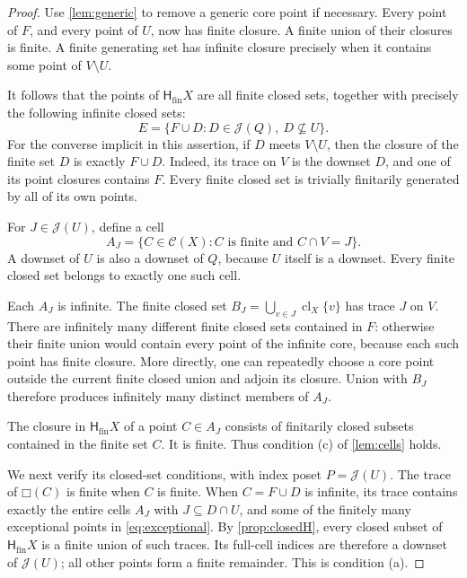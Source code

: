 \documentclass[11pt,a4paper]{article}
\theoremstyle{definition}
\newcommand{\Cl}{\mathcal C}
\newcommand{\Hfin}{\mathsf H_{\mathrm{fin}}}
\newcommand{\JJ}{\mathcal J}
\newcommand{\cl}{\operatorname{cl}}
\newcommand{\boxF}[1]{\mathord{\Box}(#1)}
\numberwithin{equation}{section}
\begin{document}
\begin{proof}
Use \cref{lem:generic} to remove a generic core point if necessary.
Every point of $F$, and every point of $U$, now has finite closure.
A finite union of their closures is finite.  A finite generating set
has infinite closure precisely when it contains some point of $V\setminus U$.

It follows that the points of $\Hfin X$ are all finite closed sets,
together with precisely the following infinite closed sets:
\begin{equation}\label{eq:exceptional}
 E=\{F\cup D:D\in\JJ(Q),\ D\nsubseteq U\}.
\end{equation}
For the converse implicit in this assertion, if $D$ meets
$V\setminus U$, then the closure of the finite set $D$ is exactly
$F\cup D$.  Indeed, its trace on $V$ is the downset $D$, and one of its
point closures contains $F$.  Every finite closed set is trivially
finitarily generated by all of its own points.

For $J\in\JJ(U)$, define a cell
\begin{equation}\label{eq:AJ}
 A_J=\{C\in\Cl(X): C\text{ is finite and }C\cap V=J\}.
\end{equation}
A downset of $U$ is also a downset of $Q$, because $U$ itself is a
downset.  Every finite closed set belongs to exactly one such cell.

Each $A_J$ is infinite.  The finite closed set
$B_J=\bigcup_{v\in J}\cl_X\{v\}$ has trace $J$ on $V$.  There are
infinitely many different finite closed sets contained in $F$:
otherwise their finite union would contain every point of the infinite
core, because each such point has finite closure.  More directly,
one can repeatedly choose a core point outside the current finite
closed union and adjoin its closure.  Union with $B_J$ therefore
produces infinitely many distinct members of $A_J$.

The closure in $\Hfin X$ of a point $C\in A_J$ consists of finitarily
closed subsets contained in the finite set $C$.  It is finite.
Thus condition (c) of \cref{lem:cells} holds.

We next verify its closed-set conditions, with index poset $P=\JJ(U)$.
The trace of $\boxF C$ is finite when $C$ is finite.  When $C=F\cup D$
is infinite, its trace contains exactly the entire cells $A_J$ with
$J\subseteq D\cap U$, and some of the finitely many exceptional points
in \eqref{eq:exceptional}.  By \cref{prop:closedH}, every closed subset
of $\Hfin X$ is a finite union of such traces.  Its full-cell indices
are therefore a downset of $\JJ(U)$; all other points form a finite
remainder.  This is condition (a).


\end{proof}
\end{document}
